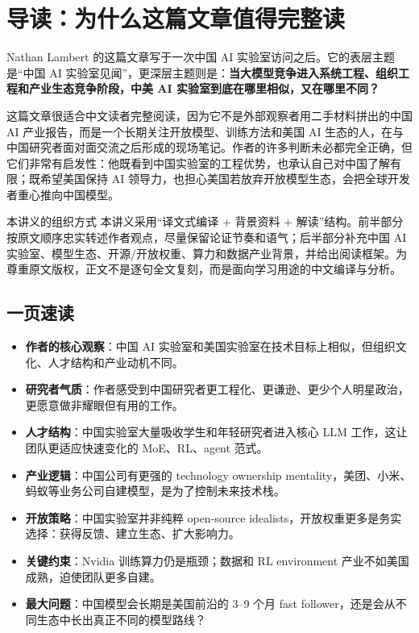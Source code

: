\section{导读：为什么这篇文章值得完整读}

Nathan Lambert 的这篇文章写于一次中国 AI 实验室访问之后。它的表层主题是``中国 AI 实验室见闻''，更深层主题则是：\textbf{当大模型竞争进入系统工程、组织工程和产业生态竞争阶段，中美 AI 实验室到底在哪里相似，又在哪里不同？}

这篇文章很适合中文读者完整阅读，因为它不是外部观察者用二手材料拼出的中国 AI 产业报告，而是一个长期关注开放模型、训练方法和美国 AI 生态的人，在与中国研究者面对面交流之后形成的现场笔记。作者的许多判断未必都完全正确，但它们非常有启发性：他既看到中国实验室的工程优势，也承认自己对中国了解有限；既希望美国保持 AI 领导力，也担心美国若放弃开放模型生态，会把全球开发者重心推向中国模型。

\begin{importantbox}{本讲义的组织方式}
本讲义采用``译文式编译 + 背景资料 + 解读''结构。前半部分按原文顺序忠实转述作者观点，尽量保留论证节奏和语气；后半部分补充中国 AI 实验室、模型生态、开源/开放权重、算力和数据产业背景，并给出阅读框架。为尊重原文版权，正文不是逐句全文复刻，而是面向学习用途的中文编译与分析。
\end{importantbox}

\subsection{一页速读}

\begin{itemize}[leftmargin=1.5em]
    \item \textbf{作者的核心观察}：中国 AI 实验室和美国实验室在技术目标上相似，但组织文化、人才结构和产业动机不同。
    \item \textbf{研究者气质}：作者感受到中国研究者更工程化、更谦逊、更少个人明星政治，更愿意做非耀眼但有用的工作。
    \item \textbf{人才结构}：中国实验室大量吸收学生和年轻研究者进入核心 LLM 工作，这让团队更适应快速变化的 MoE、RL、agent 范式。
    \item \textbf{产业逻辑}：中国公司有更强的 technology ownership mentality，美团、小米、蚂蚁等业务公司自建模型，是为了控制未来技术栈。
    \item \textbf{开放策略}：中国实验室并非纯粹 open-source idealists，开放权重更多是务实选择：获得反馈、建立生态、扩大影响力。
    \item \textbf{关键约束}：Nvidia 训练算力仍是瓶颈；数据和 RL environment 产业不如美国成熟，迫使团队更多自建。
    \item \textbf{最大问题}：中国模型会长期是美国前沿的 3--9 个月 fast follower，还是会从不同生态中长出真正不同的模型路线？
\end{itemize}


